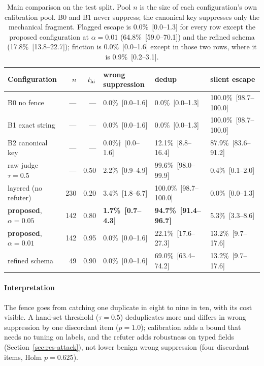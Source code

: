 \begin{table}[!tbp]
\centering\scriptsize\setlength{\tabcolsep}{3.5pt}
\caption{Main comparison on the test split. Pool $n$ is the size of each configuration's own calibration pool. B0 and B1 never suppress; the canonical key suppresses only the mechanical fragment. Flagged escape is 0.0\%~[0.0--1.3] for every row except the proposed configuration at $\alpha=0.01$ (64.8\%~[59.0--70.1]) and the refined schema (17.8\%~[13.8--22.7]); friction is 0.0\%~[0.0--1.6] except in those two rows, where it is 0.9\%~[0.2--3.1].}\label{tab:main}
\begin{tabular}{@{}lrrlll@{}}
\toprule
Configuration & $n$ & $t_{\mathrm{hi}}$ & wrong suppression & dedup & silent escape \\
\midrule
B0 no fence & --- & --- & 0.0\%~[0.0--1.6] & 0.0\%~[0.0--1.3] & 100.0\%~[98.7--100.0] \\
B1 exact string & --- & --- & 0.0\%~[0.0--1.6] & 0.0\%~[0.0--1.3] & 100.0\%~[98.7--100.0] \\
B2 canonical key & --- & --- & 0.0\%$\dagger$~[0.0--1.6] & 12.1\%~[8.8--16.4] & 87.9\%~[83.6--91.2] \\
raw judge $\tau=0.5$ & --- & 0.50 & 2.2\%~[0.9--4.9] & 99.6\%~[98.0--99.9] & 0.4\%~[0.1--2.0] \\
layered (no refuter) & 230 & 0.20 & 3.4\%~[1.8--6.7] & 100.0\%~[98.7--100.0] & 0.0\%~[0.0--1.3] \\
\textbf{proposed}, $\alpha=0.05$ & 142 & 0.80 & \textbf{1.7\%~[0.7--4.3]} & \textbf{94.7\%~[91.4--96.7]} & 5.3\%~[3.3--8.6] \\
\textbf{proposed}, $\alpha=0.01$ & 142 & 0.95 & 0.0\%~[0.0--1.6] & 22.1\%~[17.6--27.3] & 13.2\%~[9.7--17.6] \\
refined schema & 49 & 0.90 & 0.0\%~[0.0--1.6] & 69.0\%~[63.4--74.2] & 13.2\%~[9.7--17.6] \\
\bottomrule
\end{tabular}
\end{table}



\paragraph{Interpretation} The fence goes from catching one duplicate in eight to nine in ten, with its cost visible. A hand-set threshold ($\tau=0.5$) deduplicates more and differs in wrong suppression by one discordant item ($p=1.0$); calibration adds a bound that needs no tuning on labels, and the refuter adds robustness on typed fields (Section~\ref{sec:res-attack}), not lower benign wrong suppression (four discordant items, Holm $p=0.625$).

